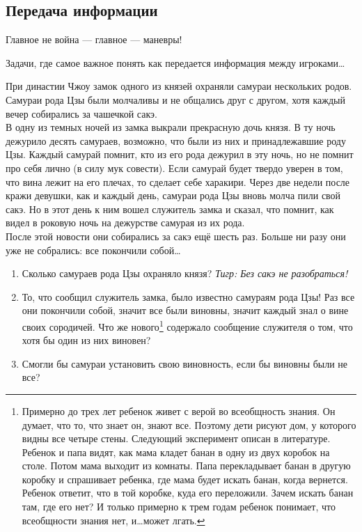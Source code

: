 


\subsection{Передача информации}

Главное не война --- главное --- маневры!

Задачи, где самое важное понять как передается информация между игроками\ldots

\begin{problem}
При династии Чжоу замок одного из князей охраняли самураи нескольких родов. Самураи рода Цзы были молчаливы и не общались друг с другом, хотя каждый вечер собирались за чашечкой сакэ.\\
В одну из темных ночей из замка выкрали прекрасную дочь князя. В ту ночь дежурило десять самураев, возможно, что были из них и принадлежавшие роду Цзы. Каждый самурай помнит, кто из его рода дежурил в эту ночь, но не помнит про себя лично (в силу мук совести). Если самурай будет твердо уверен в том, что вина лежит на его плечах, то сделает себе харакири.
Через две недели после кражи девушки, как и каждый день, самураи рода Цзы вновь молча пили свой сакэ. Но в этот день к ним вошел служитель замка и сказал, что помнит, как видел в роковую ночь на дежурстве самурая из их рода.\\
После этой новости они собирались за сакэ ещё шесть раз. Больше ни разу они уже не собрались: все покончили собой\ldots \\
\begin{enumerate}
\item Сколько самураев рода Цзы охраняло князя? {\it Тигр: Без сакэ не разобраться!}
\item То, что сообщил служитель замка, было известно  самураям рода Цзы! Раз все они покончили собой, значит все были виновны, значит каждый знал о вине своих сородичей. Что же нового\footnote{ Примерно до трех лет ребенок живет с верой во всеобщность знания. Он думает, что то, что знает он, знают все. Поэтому дети рисуют дом, у которого видны все четыре стены. Следующий эксперимент описан в литературе. Ребенок и папа видят, как мама кладет банан в одну из двух коробок на столе. Потом мама выходит из комнаты. Папа перекладывает банан в другую коробку и спрашивает ребенка, где мама будет искать банан, когда вернется. Ребенок ответит, что в той коробке, куда его переложили. Зачем искать банан там, где его нет? И только примерно к трем годам ребенок понимает, что всеобщности знания нет, и\ldots может лгать.} содержало сообщение служителя о том, что хотя бы один из них виновен? \\
\item  Смогли бы самураи установить свою виновность, если бы виновны были не все?
\end{enumerate}


\begin{sol}

\end{sol}
\end{problem}




